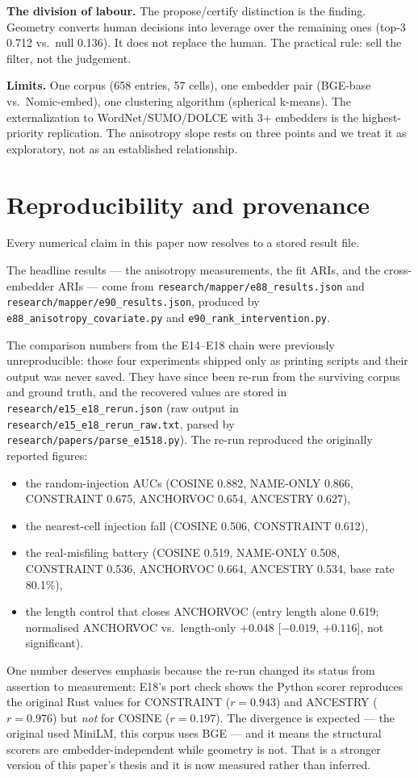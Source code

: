 \documentclass[11pt]{article}
\begin{document}
\textbf{The division of labour.} The propose/certify distinction is the
finding. Geometry converts human decisions into leverage over the remaining
ones (top-3 0.712 vs.\ null 0.136). It does not replace the human. The
practical rule: sell the filter, not the judgement.

\textbf{Limits.} One corpus (658 entries, 57 cells), one embedder pair
(BGE-base vs.\ Nomic-embed), one clustering algorithm (spherical k-means).
The externalization to WordNet/SUMO/DOLCE with 3+ embedders is the
highest-priority replication. The anisotropy slope rests on three points
and we treat it as exploratory, not as an established relationship.

\section*{Reproducibility and provenance}

Every numerical claim in this paper now resolves to a stored result file.

The headline results --- the anisotropy measurements, the fit ARIs, and the
cross-embedder ARIs --- come from
\texttt{research/mapper/e88\_results.json} and
\texttt{research/mapper/e90\_results.json}, produced by
\texttt{e88\_anisotropy\_covariate.py} and \texttt{e90\_rank\_intervention.py}.

The comparison numbers from the E14--E18 chain were previously
unreproducible: those four experiments shipped only as printing scripts and
their output was never saved. They have since been re-run from the surviving
corpus and ground truth, and the recovered values are stored in
\texttt{research/e15\_e18\_rerun.json} (raw output in
\texttt{research/e15\_e18\_rerun\_raw.txt}, parsed by
\texttt{research/papers/parse\_e1518.py}). The re-run reproduced the
originally reported figures:

\begin{itemize}
\item the random-injection AUCs (COSINE 0.882, NAME-ONLY 0.866,
  CONSTRAINT 0.675, ANCHORVOC 0.654, ANCESTRY 0.627),
\item the nearest-cell injection fall (COSINE 0.506, CONSTRAINT 0.612),
\item the real-misfiling battery (COSINE 0.519, NAME-ONLY 0.508,
  CONSTRAINT 0.536, ANCHORVOC 0.664, ANCESTRY 0.534, base rate 80.1\%),
\item the length control that closes ANCHORVOC (entry length alone 0.619;
  normalised ANCHORVOC vs.\ length-only $+0.048$ [$-0.019$, $+0.116$],
  not significant).
\end{itemize}

One number deserves emphasis because the re-run changed its status from
assertion to measurement: E18's port check shows the Python scorer
reproduces the original Rust values for CONSTRAINT ($r = 0.943$) and
ANCESTRY ($r = 0.976$) but \emph{not} for COSINE ($r = 0.197$). The
divergence is expected --- the original used MiniLM, this corpus uses
BGE --- and it means the structural scorers are embedder-independent while
geometry is not. That is a stronger version of this paper's thesis and it
is now measured rather than inferred.
\end{document}
